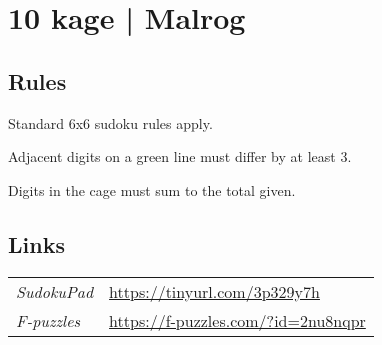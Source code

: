 \section{10 kage | {\normalfont Malrog}}
\label{sec:53-10-kage-malrog}

\subsection*{Rules}
\begin{markdown}
Standard 6x6 sudoku rules apply.

Adjacent digits on a green line must differ by at least 3.

Digits in the cage must sum to the total given.
\end{markdown}
\subsection*{Links}
\begin{tabularx}{\textwidth}{l X}
\emph{SudokuPad} & \url{https://tinyurl.com/3p329y7h} \\
\emph{F-puzzles} & \url{https://f-puzzles.com/?id=2nu8nqpr} \\
\end{tabularx}
\pagebreak

